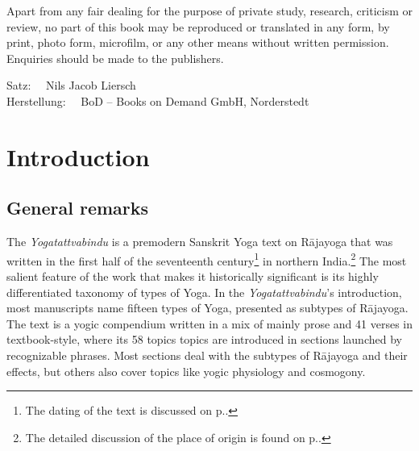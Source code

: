 \smallskip

\noindent
Apart from any fair dealing for the purpose of private study, research, criticism or review, no
part of this book may be reproduced or translated in any form, by print, photo form, microfilm, or
any other means without written permission. Enquiries should be made to the publishers.

\bigskip

\noindent
Satz: \ \ Nils Jacob Liersch \\
Herstellung: \ \ BoD – Books on Demand GmbH, Norderstedt  \\

\bigskip

\noindent

\normalsize

\newpage

\clearpage
\tableofcontents
\addtocounter{page}{-1}
\thispagestyle{empty}
\clearpage


\mainmatter

\chapter{Introduction}
\cleardoublepage

\section{General remarks}
The \textit{Yogatattvabindu} is a premodern Sanskrit Yoga text on Rājayoga that was written in the first half of the seventeenth century\footnote{The dating of the text is discussed on p.\pageref{dating}.} in northern India.\footnote{The detailed discussion of the place of origin is found on p.\pageref{placeoforigin}.} The most salient feature of the work that makes it historically significant is its highly differentiated taxonomy of types of Yoga. In the \textit{Yogatattvabindu}'s introduction, most manuscripts name fifteen types of Yoga, presented as subtypes of Rājayoga. The text is a yogic compendium written in a mix of mainly prose and 41 verses in textbook-style, where its 58 topics topics are introduced in sections launched by recognizable phrases. Most sections deal with the subtypes of Rājayoga and their effects, but others also cover topics like yogic physiology and cosmogony.

